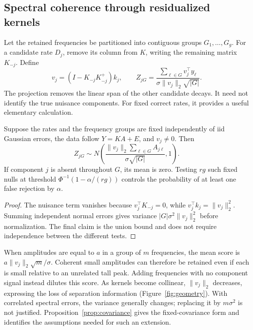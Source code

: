 \subsection{Spectral coherence through residualized kernels}\label{sec:screen}
Let the retained frequencies be partitioned into contiguous groups $G_1,\ldots,G_g$. For a candidate rate $D_j$, remove its column from $K$, writing the remaining matrix $K_{-j}$. Define
\begin{equation}\label{eq:score}
 v_j=(I-K_{-j}K_{-j}^+)k_j,\qquad
 Z_{jG}=\frac{\sum_{\ell\in G}v_j^\top y_\ell}
 {\sigma\|v_j\|_2\sqrt{|G|}}.
\end{equation}
The projection removes the linear span of the other candidate decays. It need not identify the true nuisance components. For fixed correct rates, it provides a useful elementary calculation.

\begin{Proposition}\label{prop:screen}
Suppose the rates and the frequency groups are fixed independently of iid Gaussian errors, the data follow $Y=KA+E$, and $v_j\ne0$. Then
\begin{equation}\label{eq:scoremean}
 Z_{jG}\sim N\left(
 \frac{\|v_j\|_2\sum_{\ell\in G}A_{j\ell}}{\sigma\sqrt{|G|}},1\right).
\end{equation}
If component $j$ is absent throughout $G$, its mean is zero. Testing $rg$ such fixed nulls at threshold $\Phi^{-1}(1-\alpha/(rg))$ controls the probability of at least one false rejection by $\alpha$.
\end{Proposition}
\begin{proof}
The nuisance term vanishes because $v_j^\top K_{-j}=0$, while $v_j^\top k_j=\|v_j\|_2^2$. Summing independent normal errors gives variance $|G|\sigma^2\|v_j\|_2^2$ before normalization. The final claim is the union bound and does not require independence between the different tests.
\end{proof}

When amplitudes are equal to $a$ in a group of $m$ frequencies, the mean score is $a\|v_j\|_2\sqrt m/\sigma$. Coherent small amplitudes can therefore be retained even if each is small relative to an unrelated tall peak. Adding frequencies with no component signal instead dilutes this score. As kernels become collinear, $\|v_j\|_2$ decreases, expressing the loss of separation information (Figure~\ref{fig:geometry}). With correlated spectral errors, the variance generally changes; replacing it by $m\sigma^2$ is not justified. Proposition~\ref{prop:covariance} gives the fixed-covariance form and identifies the assumptions needed for such an extension.

